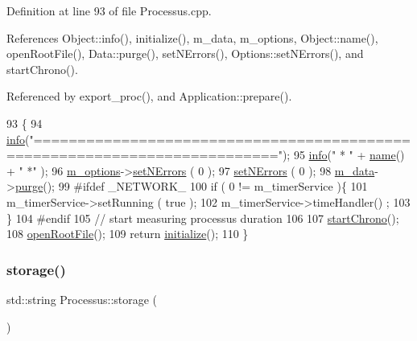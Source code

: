 Definition at line 93 of file Processus.\+cpp.



References Object\+::info(), initialize(), m\+\_\+data, m\+\_\+options, Object\+::name(), open\+Root\+File(), Data\+::purge(), set\+N\+Errors(), Options\+::set\+N\+Errors(), and start\+Chrono().



Referenced by export\+\_\+proc(), and Application\+::prepare().


\begin{DoxyCode}
93                                       \{
94   \hyperlink{classObject_a644fd329ea4cb85f54fa6846484b84a8}{info}(\textcolor{stringliteral}{"=========================================================================="});
95   \hyperlink{classObject_a644fd329ea4cb85f54fa6846484b84a8}{info}(\textcolor{stringliteral}{"   * "} + \hyperlink{classObject_a300f4c05dd468c7bb8b3c968868443c1}{name}() + \textcolor{stringliteral}{" *"} );
96   \hyperlink{classProcessus_a74205f3c1e00c4448f7b3257c2351797}{m\_options}->\hyperlink{classOptions_a45368b495036869c67fe0e6bf9abc4e6}{setNErrors} ( 0 );
97   \hyperlink{classProcessus_a831b027b9cf18ab56fa6147b5d3055da}{setNErrors} ( 0 );
98   \hyperlink{classProcessus_a3da9a9de8af54e2f47807a3e09dfccff}{m\_data}->\hyperlink{classData_a26209d56fdc86a72ae391fcd3bd2adfd}{purge}();
99 \textcolor{preprocessor}{#ifdef \_NETWORK\_}
100   \textcolor{keywordflow}{if} ( 0 != m\_timerService )\{
101     m\_timerService->setRunning ( \textcolor{keyword}{true} );
102     m\_timerService->timeHandler() ;
103   \}
104 \textcolor{preprocessor}{#endif}
105   \textcolor{comment}{// start measuring processus duration}
106   
107   \hyperlink{classProcessus_a5e4d34b86241fa0756e07375a14ff4b2}{startChrono}();
108   \hyperlink{classProcessus_aacf6812880c1d1a2bf14a4a39458f443}{openRootFile}();
109   \textcolor{keywordflow}{return} \hyperlink{classProcessus_aee88ad7b77ae7319cf8b128e9dd2ea11}{initialize}();
110 \}
\end{DoxyCode}
\mbox{\label{classProcessus_a33fa1a0b54a636e5cdd680669fd9ea51}} 
\subsubsection{\texorpdfstring{storage()}{storage()}}
{\footnotesize\ttfamily std\+::string Processus\+::storage (\begin{DoxyParamCaption}{ }\end{DoxyParamCaption})\hspace{0.3cm}{\ttfamily [inline]}}

